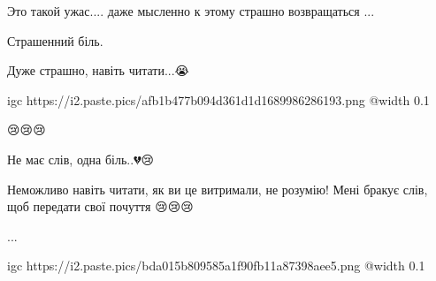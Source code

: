 
Это такой ужас.... даже мысленно к этому страшно возвращаться ...


Страшенний біль.


Дуже страшно, навіть читати...😭


\ifcmt
  igc https://i2.paste.pics/afb1b477b094d361d1d1689986286193.png
	@width 0.1
\fi


😢😢😢


Не має слів, одна біль..💔😢


Неможливо навіть читати, як ви це витримали, не розумію! Мені бракує слів, щоб
передати свої почуття 😢😢😢


...

\ifcmt
  igc https://i2.paste.pics/bda015b809585a1f90fb11a87398aee5.png
	@width 0.1
\fi
